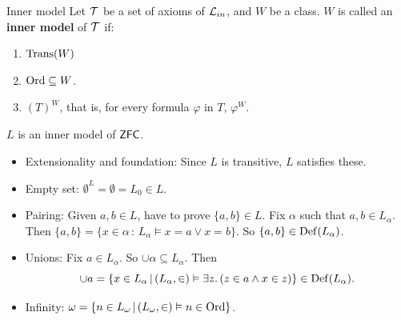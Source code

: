 \documentclass{article}
\begin{document}
\begin{fancydefine}{Inner model}
    Let $\mathcal{T}$ be a set of axioms of $\mathcal{L}_{in}$, and $W$ be a class. $W$ is called an \textbf{inner model} of $\mathcal{T}$ if: \begin{enumerate}
        \item[(i)] $\operatorname{Trans}(W)$
        \item[(ii)] $\operatorname{Ord} \subseteq W$.
        \item[(iii)] $(T)^{W}$, that is, for every formula $\varphi$ in $T$, $\varphi^{W}$.
    \end{enumerate}
\end{fancydefine}
\begin{fancythm}{}
    $L$ is an inner model of $\mathsf{ZFC}$.
\end{fancythm}
\proof \hspace{0.1cm}\begin{itemize}
    \item Extensionality and foundation: Since $L$ is transitive, $L$ satisfies these.
    \item Empty set: $\emptyset^{L} = \emptyset = L_{0} \in L$.
    \item Pairing: Given $a,b \in L$, have to prove $\{a,b\} \in L$. Fix $\alpha$ such that $a,b \in L_{\alpha}$. Then $\{a,b\} = \{ x \in \alpha \, : \, L_{\alpha} \models x = a \vee x=b\}$. So $\{a,b\} \in \operatorname{Def}(L_{\alpha})$.
    \item Unions: Fix $a \in L_{\alpha}$. So $\cup \alpha \subseteq L_{\alpha}$. Then \[ \cup a = \{ x \in L_{\alpha} \, | \, (L_{\alpha}, \in) \vDash \exists z. \, (z \in a \wedge x \in z) \} \in \operatorname{Def}(L_{\alpha}).\]
    \item Infinity: $\omega = \{ n \in L_{\omega} \, | \, (L_{\omega}, \in) \vDash n \in \operatorname{Ord}\}$.
\end{itemize}
\end{document}
